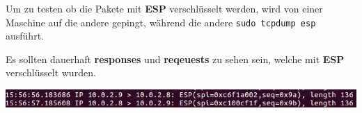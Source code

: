 Um zu testen ob die Pakete mit \textbf{ESP} verschlüsselt werden, wird von einer Maschine auf die andere gepingt, während die andere \verb|sudo tcpdump esp| ausführt.

Es sollten dauerhaft \textbf{responses} und \textbf{reqeuests} zu sehen sein, welche mit \textbf{ESP} verschlüsselt wurden. 

\begin{minipage}{\linewidth}
	\centering
	\includegraphics[width=0.8\linewidth]{images/tcpdump}
\end{minipage}